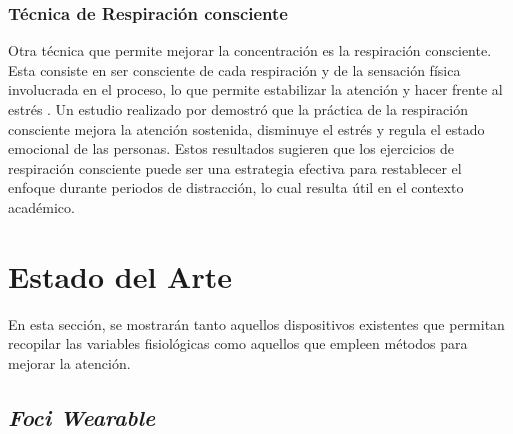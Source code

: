 \subsubsection{Técnica de Respiración consciente}

Otra técnica que permite mejorar la concentración es la respiración consciente. Esta consiste en ser consciente de cada respiración y de la sensación física involucrada en el proceso, lo que permite estabilizar la atención y hacer frente al estrés \autocite{2.Respiracion1}. Un estudio realizado por \textcite{2.Respiracion2} demostró que la práctica de la respiración consciente mejora la atención sostenida, disminuye el estrés y regula el estado emocional de las personas. Estos resultados sugieren que los ejercicios de respiración consciente puede ser una estrategia efectiva para restablecer el enfoque durante periodos de distracción, lo cual resulta útil en el contexto académico.

%
\section{Estado del Arte}
En esta sección, se mostrarán tanto aquellos dispositivos existentes que permitan recopilar las variables fisiológicas como aquellos que empleen métodos para mejorar la atención. 
    \subsection{\textit{Foci Wearable}}

